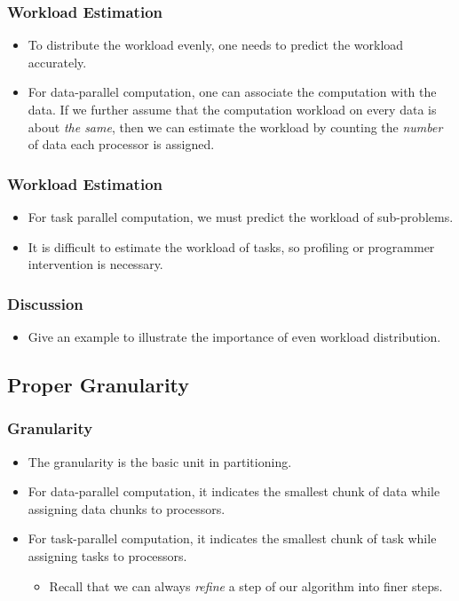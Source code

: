 \documentclass{beamer}
\begin{document}
\begin{CJK}{UTF8}{bsmi}
\begin{frame}
\frametitle{Workload Estimation}
\begin{itemize}
\item To distribute the workload evenly, one needs to predict the workload accurately.
\item For data-parallel computation, one can associate the computation with the data.
If we further assume that the computation workload on every data is about {\em the same}, then we can estimate the workload by counting the {\em number} of data each processor is assigned.
\end{itemize}
\end{frame}

\begin{frame}
\frametitle{Workload Estimation}
\begin{itemize}
\item For task parallel computation, we must predict the workload of sub-problems.
\item It is difficult to estimate the workload of tasks, so profiling or programmer intervention is necessary.
\end{itemize}
\end{frame}

\begin{frame}
\frametitle{Discussion}
\begin{itemize}
\item Give an example to illustrate the importance of even workload distribution.
\end{itemize}
\end{frame}

\subsection{Proper Granularity}

\begin{frame}
\frametitle{Granularity}
\begin{itemize}
\item The granularity is the basic unit in partitioning.
\item For data-parallel computation, it indicates the smallest chunk of data while assigning data chunks to processors.
\item For task-parallel computation, it indicates the smallest chunk of task while assigning tasks to processors.
\begin{itemize}
\item Recall that we can always {\em refine} a step of our algorithm into finer steps.
\end{itemize}
\end{itemize}
\end{frame}


\end{CJK}
\end{document}
